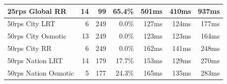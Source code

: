 \documentclass[draft,final]{vutinfth} %
\begin{document}
\begin{table}[]
\begin{tabular}{lrrrrrr}
25rps Global RR      & 14                                                             & 99                                                                                        & 65.4\%                                                                        & 501ms                                                       & 410ms                                                         & 937ms                                                      \\ \hline
50rps City LRT       & 6                                                              & 249                                                                                       & 0.0\%                                                                         & 127ms                                                       & 124ms                                                         & 177ms                                                      \\
50rps City Osmotic   & 13                                                             & 249                                                                                       & 0.0\%                                                                         & 123ms                                                       & 123ms                                                         & 164ms                                                      \\
50rps City RR        & 6                                                              & 249                                                                                       & 0.0\%                                                                         & 162ms                                                       & 141ms                                                         & 248ms                                                      \\ \hline
50rps Nation LRT     & 14                                                             & 179                                                                                       & 17.7\%                                                                        & 153ms                                                       & 129ms                                                         & 270ms                                                      \\
50rps Nation Osmotic & 5                                                              & 177                                                                                       & 24.3\%                                                                        & 165ms                                                       & 135ms                                                         & 283ms                                                      \\

\end{tabular}
\end{table}
\end{document}
